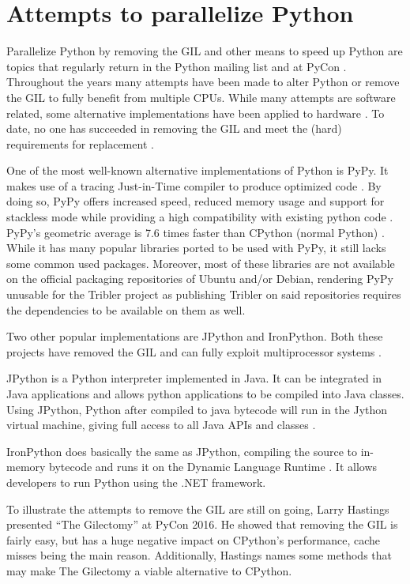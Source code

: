 \section{Attempts to parallelize Python}
\label{sct:removing_the_gil}

Parallelize Python by removing the GIL and other means to speed up Python are topics that regularly return in the Python mailing list and at PyCon \cite{python2015global}.
Throughout the years many attempts have been made to alter Python or remove the GIL to fully benefit from multiple CPUs.
While many attempts are software related, some alternative implementations have been applied to hardware \cite{tabba2010adding}.
To date, no one has succeeded in removing the GIL and meet the (hard) requirements for replacement \cite{python2015global}.

One of the most well-known alternative implementations of Python is PyPy.
It makes use of a tracing Just-in-Time compiler to produce optimized code \cite{bolz2009tracing}.
By doing so, PyPy offers increased speed, reduced memory usage and support for stackless mode while providing a high compatibility with existing python code \cite{pypy2016pypy}.
PyPy's geometric average is 7.6 times faster than CPython (normal Python) \cite{pypy2016speed}.
While it has many popular libraries ported to be used with PyPy, it still lacks some common used packages.
Moreover, most of these libraries are not available on the official packaging repositories of Ubuntu and/or Debian, rendering PyPy unusable for the Tribler project as publishing Tribler on said repositories requires the dependencies to be available on them as well.

Two other popular implementations are JPython and IronPython.
Both these projects have removed the GIL and can fully exploit multiprocessor systems \cite{python2015global}.

JPython is a Python interpreter implemented in Java. It can be integrated in Java applications and allows python applications to be compiled into Java classes.
Using JPython, Python after compiled to java bytecode will run in the Jython virtual machine, giving full access to all Java APIs and classes \cite{jython2016why}.

IronPython does basically the same as JPython, compiling the source to in-memory bytecode and runs it on the Dynamic Language Runtime \cite{ironpython2014}.
It allows developers to run Python using the .NET framework.

To illustrate the attempts to remove the GIL are still on going, Larry Hastings presented \enquote{The Gilectomy} at PyCon 2016.
He showed that removing the GIL is fairly easy, but has a huge negative impact on CPython's performance, cache misses being the main reason.
Additionally, Hastings names some methods that may make The Gilectomy a viable alternative to CPython.\\

